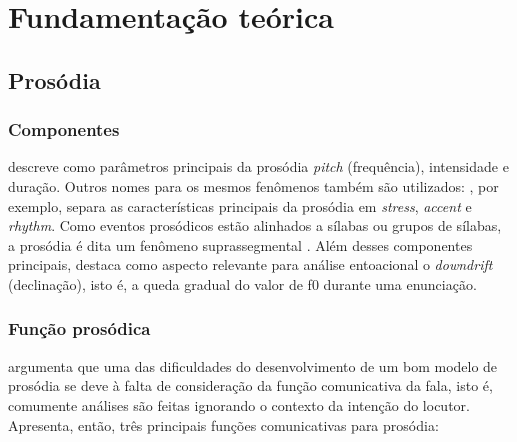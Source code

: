 
\chapter{Fundamentação teórica}

\section{Prosódia}
\subsection{Componentes}
 descreve como parâmetros principais da prosódia
\emph{pitch} (frequência), intensidade e duração. Outros nomes para os mesmos
fenômenos também são utilizados: , por exemplo, separa as
características principais da prosódia em \emph{stress}, \emph{accent} e
\emph{rhythm}. Como eventos prosódicos estão alinhados a sílabas ou grupos de
sílabas, a prosódia é dita um fenômeno suprassegmental \cite{ladd}. Além desses
componentes principais,  destaca como aspecto relevante
para análise entoacional o \emph{downdrift} (declinação), isto é, a queda
gradual do valor de f0 durante uma enunciação.


\subsection{Função prosódica}
 argumenta que uma das dificuldades do desenvolvimento de
um bom modelo de prosódia se deve à falta de consideração da função
comunicativa da fala, isto é, comumente análises são feitas ignorando o contexto
da intenção do locutor. Apresenta, então, três principais funções comunicativas
para prosódia:

